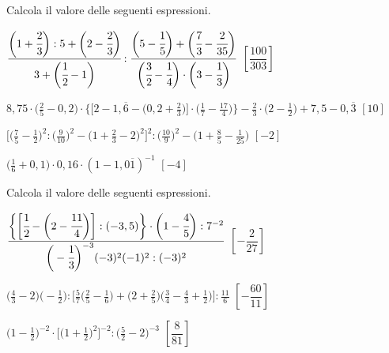 \begin{esercizio}[\Ast]
\label{ese:3.152}
 Calcola il valore delle seguenti espressioni.
\begin{enumeratea}
\spazielenx
\item $\displaystyle{\cfrac{\bigg(1+\cfrac{2}{3}\bigg):5+\bigg(2-
\cfrac{2}{3}\bigg)}{3+\bigg(\cfrac{1}{2}-1\bigg)}:
\frac{\bigg(5-\cfrac{1}{5}\bigg)+\bigg(\cfrac{7}{3}-\cfrac{2}{35}\bigg)}
{\bigg(\cfrac{3}{2}-\cfrac{1}{4}\bigg)\cdot
\bigg(3-\cfrac{1}{3}\bigg)}}$
  \hfill \(\left[\dfrac{100}{303} \right]\)
\item $\displaystyle{8,75\cdot\bigg(\frac{2}{5}-0,2\bigg)\cdot
\bigg\{\bigg[2-1,\overline{6}-\bigg(0,2+\frac{2}{3}\bigg)\bigg]
\cdot\bigg(\frac{1}{7}-\frac{17}{4}\bigg)\bigg\}-\frac{2}{3}\cdot
\bigg(2-\frac{1}{2}\bigg)+7,5-0,\overline{3}}$
  \hfill \(\left[10 \right]\)
\item $\displaystyle{\bigg[\bigg(\frac{7}{5}-\frac{1}{2}\bigg)^{2}:
\bigg(\frac{9}{10}\bigg)^{2}-
\bigg(1+\frac{2}{3}-2\bigg)^{2}\bigg]^{2}:\bigg(\frac{10}{9}\bigg)^{2}-
\bigg(1+\frac{8}{5}-\frac{1}{25}\bigg)}$
  \hfill \(\left[-2 \right]\)
\item $\displaystyle{\bigg(\frac{1}{6}+0,1\bigg)\cdot 0,16\cdot
(1-1,0\overline{1})^{-1}}$
  \hfill \(\left[-4 \right]\)
\end{enumeratea}
\end{esercizio}

\begin{esercizio}[\Ast]
\label{ese:3.153}
 Calcola il valore delle seguenti espressioni.
\begin{enumeratea}
\spazielenx
\item $\displaystyle{\frac{\bigg\{\bigg[\cfrac{1}{2}-\bigg(2-
\cfrac{11}{4}\bigg)\bigg]:(-3,5)\bigg\}\cdot
\bigg(1-\cfrac{4}{5}\bigg):7^{-2}}{\bigg(-{\cfrac{1}{3}}
\bigg)^{-3}(-3)^{2}(-1)^{2}:(-3)^{2}}}$
  \hfill \(\left[-\dfrac{2}{27} \right]\)
\item $\displaystyle{\bigg(\frac{4}{3}-2\bigg)\bigg(-{\frac{1}{2}}\bigg):
\bigg[\frac{5}{7}\bigg(\frac{2}{5}-\frac{1}{6}\bigg)
+\bigg(2+\frac{2}{5}\bigg)\bigg(\frac{3}{4}-\frac{4}{3}+
\frac{1}{2}\bigg)\bigg]:\frac{11}{6}}$
  \hfill \(\left[-\dfrac{60}{11} \right]\)
\item $\displaystyle{\bigg(1-\frac{1}{2}\bigg)^{-2}\cdot
\bigg[\bigg(1+\frac{1}{2}\bigg)^{2}\bigg]^{-2}:\bigg(\frac{5}{2}-2
\bigg)^{-3}}$
  \hfill \(\left[\dfrac{8}{81} \right]\)
\end{enumeratea}
\end{esercizio}

